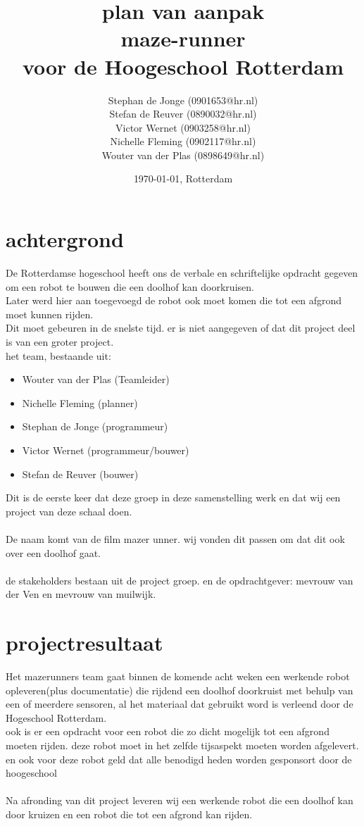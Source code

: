 \documentclass[oneside]{book}
\title{plan van aanpak\\
maze-runner\\
\normalsize voor de Hoogeschool Rotterdam
}
\author{
	Stephan de Jonge (0901653@hr.nl)\\
	Stefan de Reuver (0890032@hr.nl)\\
	Victor Wernet (0903258@hr.nl)\\
	Nichelle Fleming (0902117@hr.nl)\\
	Wouter van der Plas (0898649@hr.nl)
}
\date{\today, Rotterdam}
\begin{document}
\maketitle
\tableofcontents


\chapter{achtergrond}

De Rotterdamse hogeschool heeft ons de verbale en schriftelijke opdracht gegeven om een robot te bouwen die een doolhof kan doorkruisen.\\
Later werd hier aan toegevoegd de robot  ook moet komen die tot een afgrond moet kunnen rijden.\\
Dit moet gebeuren in de snelste tijd. er is niet aangegeven of dat dit project deel is van een groter project.\\
het team, bestaande uit:\\
\begin{itemize}
	\item Wouter van der Plas (Teamleider)
	\item Nichelle Fleming (planner)
	\item Stephan de Jonge (programmeur)
	\item Victor Wernet (programmeur/bouwer)
	\item Stefan de Reuver (bouwer)
\end{itemize}	
Dit is de eerste keer dat deze groep in deze samenstelling werk en dat wij een project van deze schaal doen.\\
\\
De naam komt van de film mazer unner. wij vonden dit passen om dat dit ook over een doolhof gaat.\\
\\
de stakeholders bestaan uit de project groep. en de opdrachtgever: mevrouw van der Ven en mevrouw van muilwijk.

\clearpage
\chapter{projectresultaat}
Het mazerunners team gaat binnen de komende acht weken een werkende robot opleveren(plus documentatie) die rijdend een doolhof doorkruist met behulp van een of meerdere sensoren, al het materiaal dat gebruikt word is verleend door de Hogeschool Rotterdam.\\
ook is er een opdracht voor een robot die zo dicht mogelijk tot een afgrond moeten rijden. deze robot moet in het zelfde tijsaspekt moeten worden afgelevert. en ook voor deze robot geld dat alle benodigd heden worden gesponsort door de hoogeschool\\
\\
Na afronding van dit project leveren wij een werkende robot die een doolhof kan door kruizen en een robot die tot een afgrond kan rijden.
\clearpage
\end{document}
